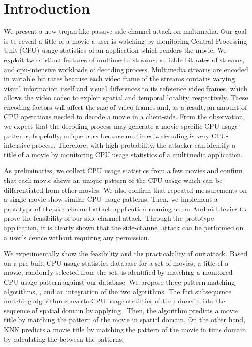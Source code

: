 \section{Introduction}
\label{sec:introduction}
We present a new trojan-like passive side-channel attack on multimedia. Our goal is to reveal a title of a movie a user is watching by monitoring Central Processing Unit (CPU) usage statistics of an application which renders the movie. We exploit two distinct features of multimedia streams: variable bit rates of streams, and cpu-intensive workloads of decoding process. Multimedia streams are encoded in variable bit rates because each video frame of the streams contains varying visual information itself and visual differences to its reference video frames, which allows the video codec to exploit spatial and temporal locality, respectively. These encoding factors will affect the size of video frames and, as a result, an amount of CPU operations needed to decode a movie in a client-side. From the observation, we expect that the decoding process may generate a movie-specific CPU usage patterns, hopefully, unique ones because multimedia decoding is very CPU-intensive process. Therefore, with high probability, the attacker can identify a title of a movie by monitoring CPU usage statistics of a multimedia application.  

As preliminaries, we collect CPU usage statistics from a few movies and confirm that each movie shows an unique pattern of the CPU usage which can be differentiated from other movies.  We also confirm that repeated measurements on a single movie show similar CPU usage patterns.  Then, we implement a prototype of the side-channel attack application running on an Android device to prove the feasibility of our side-channel attack.  Through the prototype application, it is clearly shown that the side-channel attack can be performed on a user's device without requiring any permission.

We experimentally show the feasibility and the practicability of our attack. Based on a pre-built CPU usage statistics database for a set of movies, a title of a movie, randomly selected from the set, is identified by matching a monitored CPU usage pattern against our database. We propose three pattern matching algorithms, ,  and an integration of the two algorithms.  The fast subsequence matching algorithm converts CPU usage statistics of time domain into the sequence of spatial domain by applying .   Then, the algorithm predicts a movie title by matching the pattern of the movie in spatial domain.  On the other hand, KNN predicts a movie title by matching the pattern of the movie in time domain by calculating the  between the patterns. 

